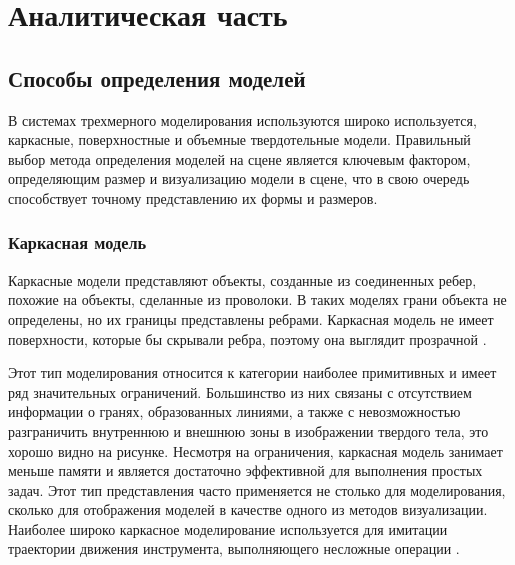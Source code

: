 \chapter{Аналитическая часть}


\section{Способы определения моделей}

В системах трехмерного моделирования используются широко используется, каркасные, поверхностные и объемные твердотельные модели. Правильный выбор метода определения моделей на сцене является ключевым фактором, определяющим размер и визуализацию модели в сцене, что в свою очередь способствует точному представлению их формы и размеров.

\subsection{Каркасная модель}
Каркасные модели представляют объекты, созданные из соединенных
ребер, похожие на объекты, сделанные из проволоки. В таких моделях грани объекта не определены, но их границы представлены ребрами. Каркасная модель не имеет поверхности, которые бы скрывали ребра, поэтому она выглядит прозрачной \cite{model_geom}.

Этот тип моделирования относится к категории наиболее примитивных и имеет ряд значительных ограничений. Большинство из них связаны с отсутствием информации о гранях, образованных линиями, а также с невозможностью разграничить внутреннюю и внешнюю зоны в изображении твердого тела, это хорошо видно на рисунке. Несмотря на ограничения, каркасная модель занимает меньше памяти и является достаточно эффективной для выполнения простых задач. Этот тип представления часто применяется не столько для моделирования, сколько для отображения моделей в качестве одного из методов визуализации. Наиболее широко каркасное моделирование используется для имитации траектории движения инструмента, выполняющего несложные операции \cite{model_geom_01}.

